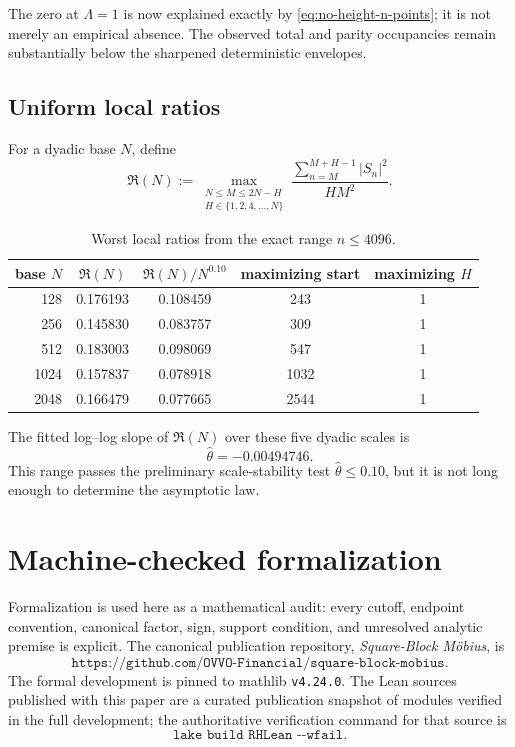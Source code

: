 \documentclass[11pt]{article}
\theoremstyle{definition}
\newcommand{\1}{\mathbf{1}}
\begin{document}
The zero at $\Lambda=1$ is now explained exactly by \cref{eq:no-height-n-points}; it is not merely an empirical absence. The observed total and parity occupancies remain substantially below the sharpened deterministic envelopes.

\subsection{Uniform local ratios}

For a dyadic base $N$, define
\begin{equation}
 \mathfrak R(N)
 :=
 \max_{\substack{
 N\le M\le2N-H\\
 H\in\{1,2,4,\ldots,N\}
 }}
 \frac{\sum_{n=M}^{M+H-1}|S_n|^2}{HM^2}.
 \label{eq:worst-local-ratio}
\end{equation}

\begin{table}[htbp]
\centering
\caption{Worst local ratios from the exact range $n\le4096$.}
\label{tab:local-ratios}
\small
\begin{tabular}{rcccc}
\toprule
base $N$ &
$\mathfrak R(N)$ &
$\mathfrak R(N)/N^{0.10}$ &
maximizing start &
maximizing $H$\\
\midrule
128  & 0.176193 & 0.108459 & 243  & 1\\
256  & 0.145830 & 0.083757 & 309  & 1\\
512  & 0.183003 & 0.098069 & 547  & 1\\
1024 & 0.157837 & 0.078918 & 1032 & 1\\
2048 & 0.166479 & 0.077665 & 2544 & 1\\
\bottomrule
\end{tabular}
\end{table}

The fitted log--log slope of $\mathfrak R(N)$ over these five dyadic scales is
\begin{equation}
 \widehat\theta=-0.00494746.
 \label{eq:local-slope}
\end{equation}
This range passes the preliminary scale-stability test $\widehat\theta\le0.10$, but it is not long enough to determine the asymptotic law.

\section{Machine-checked formalization}
\label{sec:lean}

Formalization is used here as a mathematical audit: every cutoff, endpoint convention, canonical factor, sign, support condition, and unresolved analytic premise is explicit.  The canonical publication repository, \emph{Square-Block M\"obius}, is
\[
 \texttt{https://github.com/OVVO-Financial/square-block-mobius}.
\]
The formal development is pinned to mathlib \texttt{v4.24.0}.  The Lean sources published with this paper are a curated publication snapshot of modules verified in the full development; the authoritative verification command for that source is
\[
 \texttt{lake build RHLean -{}-wfail}.
\]
\end{document}
